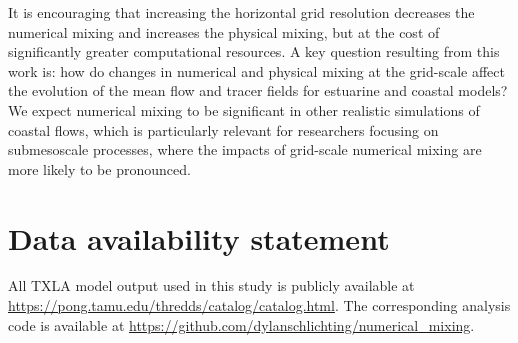 \documentclass[draft]{agujournal2019}
\begin{document}
It is encouraging that increasing the horizontal grid resolution decreases the numerical mixing and increases the physical mixing, but at the cost of significantly greater computational resources. A key question resulting from this work is: how do changes in numerical and physical mixing at the grid-scale affect the evolution of the mean flow and tracer fields for estuarine and coastal models?  We expect numerical mixing to be significant in other realistic simulations of coastal flows, which is particularly relevant for researchers focusing on submesoscale processes, where the impacts of grid-scale numerical mixing are more likely to be pronounced.

\section*{Data availability statement}

All TXLA model output used in this study is publicly available at \url{https://pong.tamu.edu/thredds/catalog/catalog.html}. The corresponding analysis code is available at \url{https://github.com/dylanschlichting/numerical_mixing}. 






%
%
%
%
%
%
%
%
%
%
\end{document}
